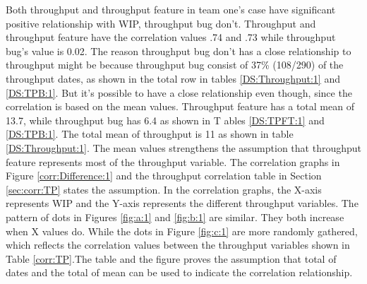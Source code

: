 \documentclass[UKenglish]{ifimaster}  %
\begin{document}
Both throughput and throughput feature in team one's case have significant positive relationship with WIP, throughput bug don't. Throughput and throughput feature have the correlation values .74 and .73 while throughput bug's value is 0.02. The reason throughput bug don't has a close relationship to throughput might be because throughput bug consist of 37\% (108/290) of the throughput dates, as shown in the total row in tables \ref{DS:Throughput:1} and \ref{DS:TPB:1}. But it's possible to have a close relationship even though, since the correlation is based on the mean values. Throughput feature has a total mean of 13.7, while throughput bug has 6.4 as shown in T ables \ref{DS:TPFT:1} and \ref{DS:TPB:1}. The total mean of throughput is 11 as shown in table \ref{DS:Throughput:1}. The mean values strengthens the assumption that throughput feature represents most of the throughput variable. The correlation  graphs in Figure \ref{corr:Difference:1}  and the throughput correlation table in Section \ref{sec:corr:TP} states the assumption. In the correlation graphs, the X-axis represents WIP and the Y-axis represents the different throughput variables. The pattern of dots in Figures \ref{fig:a:1} and \ref{fig:b:1} are similar. They both increase when X values do.  While the dots in Figure \ref{fig:c:1} are more randomly gathered, which reflects the correlation values between the throughput variables shown in Table \ref{corr:TP}.The table and the figure proves the assumption that total of dates and the total of mean can be used to indicate the correlation relationship.
\end{document}

